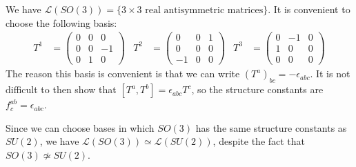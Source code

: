 \documentclass{jknotes}
\begin{document}
\begin{eg}
    We have \(\mathcal{L}(SO(3)) = \{3\times3\text{ real antisymmetric matrices}\}\). It is convenient to choose the following basis:
    \begin{align}
        T^1 &=
        \begin{pmatrix}
            0 & 0 & 0 \\
            0 & 0 & -1 \\
            0 & 1 & 0
        \end{pmatrix}
        &
        T^2 &=
        \begin{pmatrix}
            0 & 0 & 1 \\
            0 & 0 & 0 \\
            -1 & 0 & 0
        \end{pmatrix}
        &
        T^3 &=
        \begin{pmatrix}
            0 & -1 & 0 \\
            1 & 0 & 0 \\
            0 & 0 & 0
        \end{pmatrix}
    \end{align}
    The reason this basis is convenient is that we can write \((T^a)_{bc} = -\epsilon_{abc}\). It is not difficult to then show that \([T^a,T^b] = \epsilon_{abc}T^c\), so the structure constants are \(f^{ab}_c = \epsilon_{abc}\).
\end{eg}
Since we can choose bases in which \(SO(3)\) has the same structure constants as \(SU(2)\), we have \(\mathcal{L}(SO(3))\simeq\mathcal{L}(SU(2))\), despite the fact that \(SO(3)\not\simeq SU(2)\).
\end{document}
